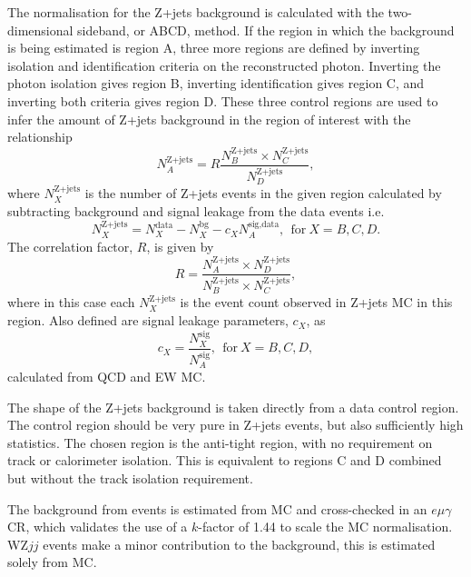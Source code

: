 The normalisation for the Z+jets background is calculated with the
two-dimensional sideband, or ABCD, method.
If the region in which the background is being estimated is region A, three more
regions are defined by inverting isolation and identification criteria on the
reconstructed photon. Inverting the photon isolation gives region B, inverting
identification gives region C, and inverting both criteria gives region D. These
three control regions are used to infer the amount of Z+jets background in the
region of interest with the relationship
%
\begin{equation*}
  \newcommand\Zj{\text{Z+jets}}
  N_A^\Zj = R\frac{N_B^\Zj \times N_C^\Zj}{N_D^\Zj},
\end{equation*}
%
where $N_X^\text{Z+jets}$ is the number of Z+jets events in the given region
calculated by subtracting background and signal leakage from the data events
i.e.
%
\begin{equation*}
  \newcommand\Zj{\text{Z+jets}}
  N_X^\Zj = N_X^\text{data} - N_X^\text{bg} - c_X N_A^\text{sig,data},
  ~~\text{for}~X=B,C,D.
\end{equation*}
%
The correlation factor, $R$, is given by
%
\begin{equation*}
  \newcommand\Zj{\text{Z+jets}}
  R = \frac{ N_A^\Zj \times N_D^\Zj }{ N_B^\Zj \times N_C^\Zj },
\end{equation*}
%
where in this case each $N_X^\text{Z+jets}$ is the
event count %
observed in Z+jets \ac{MC} in this region. Also defined are signal leakage
parameters, $c_X$, as
\begin{equation*}
  \newcommand\tsig{\text{sig}}
  c_X = \frac{N_X^\tsig}{N_A^\tsig},
  ~~\text{for}~X=B,C,D,
\end{equation*}
calculated from \ac{QCD} and \ac{EW} \Zy \ac{MC}.

The shape of the Z+jets background is taken directly from a data control region.
The control region should be very pure in Z+jets events, but also sufficiently
high statistics. The chosen region is the anti-tight region, with no requirement
on track or calorimeter isolation. This is equivalent to regions C and D
combined but without the track isolation requirement.

The background from \tty events is estimated from \ac{MC} and cross-checked in
an $e\mu\gamma$ \ac{CR}, which validates the use of a $k$-factor of 1.44 to
scale the \ac{MC} normalisation. WZ$jj$ events make a minor contribution to the
background, this is estimated solely from \ac{MC}.
